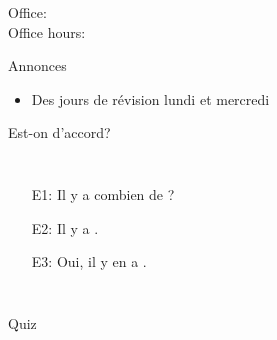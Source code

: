 \documentclass{beamer}
\subtitle[Les quantités]{Les quantités}
\begin{document}
  \begin{frame}
    \titlepage
    \tiny{Office: \\
          Office hours: }
  \end{frame}

  \begin{frame}{Annonces}
    \begin{itemize}
      \item Des jours de révision lundi et mercredi
      \item[] 
    \end{itemize}
  \end{frame}

  \begin{frame}{Est-on d'accord?}
    \begin{columns}
        \begin{itemize}
          \item[E1:] Il y a combien de \underline{}?
          \item[E2:] Il y a \underline{}.
          \item[E3:] Oui, il y en a \underline{}.
        \end{itemize}
        \begin{minipage}[c][0.6\textheight]{\linewidth}
          \begin{center}
          \end{center}
        \end{minipage}
    \end{columns}
  \end{frame}

  \begin{frame}{}
    \begin{center}
      \Large Quiz
    \end{center}
  \end{frame}
\end{document}
